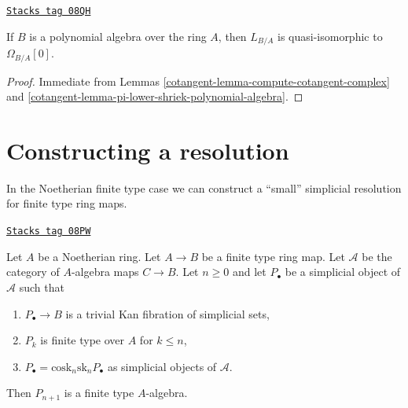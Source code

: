 \begin{lemma}
\label{cotangent-lemma-cotangent-complex-polynomial-algebra}
\href{https://stacks.math.columbia.edu/tag/08QH}{\texttt{Stacks tag 08QH}}

If $B$ is a polynomial algebra over the ring $A$, then
$L_{B/A}$ is quasi-isomorphic to $\Omega_{B/A}[0]$.
\end{lemma}

\begin{proof}

Immediate from
Lemmas \ref{cotangent-lemma-compute-cotangent-complex} and
\ref{cotangent-lemma-pi-lower-shriek-polynomial-algebra}.
\end{proof}

\section{Constructing a resolution}
\label{cotangent-section-polynomial}
In the Noetherian finite type case we can construct a ``small'' simplicial
resolution for finite type ring maps.

\begin{lemma}[Polynomial]
\label{cotangent-lemma-polynomial}
\href{https://stacks.math.columbia.edu/tag/08PW}{\texttt{Stacks tag 08PW}}

Let $A$ be a Noetherian ring. Let $A \to B$ be a finite type ring map.
Let $\mathcal{A}$ be the category of $A$-algebra maps $C \to B$. Let
$n \geq 0$ and let $P_\bullet$ be a simplicial object of $\mathcal{A}$
such that
\begin{enumerate}
\item $P_\bullet \to B$ is a trivial Kan fibration of simplicial sets,
\item $P_k$ is finite type over $A$ for $k \leq n$,
\item $P_\bullet = \text{cosk}_n \text{sk}_n P_\bullet$ as simplicial
objects of $\mathcal{A}$.
\end{enumerate}
Then $P_{n + 1}$ is a finite type $A$-algebra.
\end{lemma}


